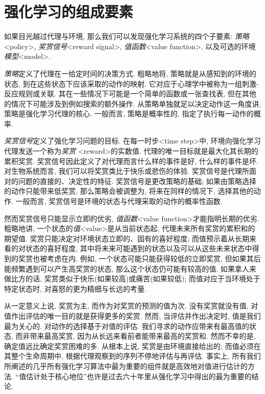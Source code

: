 \section{强化学习的组成要素}\label{sec:1.3}

如果目光越过代理与环境, 那么我们可以发现强化学习系统的四个子要素: \emph{策略}<policy>, \emph{奖赏信号}<reward signal>, \emph{值函数}<value function>, 以及可选的环境\emph{模型}<model>.

\emph{策略}定义了代理在一给定时间的决策方式. 粗略地将, 策略就是从感知到的环境的状态, 到在这些状态下应该采取的动作的映射. 它对应于心理学中被称为一组刺激-反应规则或关联. 其在一些情况下可能是一个简单的函数或一张查找表, 但在其他的情况下可能涉及到例如搜索的额外操作. 从策略单独就足以决定动作这一角度讲, 策略是强化学习代理的核心. 一般而言, 策略是概率性的, 指定了执行每一动作的概率.

\emph{奖赏信号}定义了强化学习问题的目标. 在每一时步<time step>中, 环境向强化学习代理发送一个称为\emph{奖赏} <reward>的实数值. 代理的唯一目标就是最大化其长期的累积奖赏. 奖赏信号因此定义了对代理而言什么样的事件是好, 什么样的事件是坏. 对生物系统而言, 我们可以将奖赏类比于快乐或悲伤的体验. 奖赏信号是代理所面对的问题的直接的、决定性的特征. 奖赏信号是更改策略的基础; 如果由策略选择的动作只能带来低奖赏, 那么策略会被调整为, 将来在同样的情况下, 选择其他的动作. 一般而言, 奖赏信号是环境的状态与代理采取的动作的概率性函数. 

然而奖赏信号只能显示立即的优劣, \emph{值函数}<value function>才能指明长期的优劣. 粗略地讲, 一个状态的\emph{值}<value>是从当前状态起, 代理未来所有奖赏的累积和的期望值. 奖赏只能决定对环境状态立即的、固有的喜好程度; 而值预示着从长期来看的对状态的喜好程度, 其中将未来可能遇到的状态以及可以从这些未来状态中得到的奖赏也被考虑在内. 例如, 一个状态可能只能获得较低的立即奖赏, 但如果其后能频繁遇到可以产生高奖赏的状态, 那么这个状态仍可能有较高的值. 如果拿人来做比方的话, 奖赏类似于快乐(如果较高)或痛苦(如果较低); 而值对应于当环境处于特定状态时, 对喜怒的更为精细与长远的考量.

从一定意义上说, 奖赏为主, 而作为对奖赏的预测的值为次. 没有奖赏就没有值, 对值作出评估的唯一目的就是获得更多的奖赏. 然而, 当评估并作出决定时, 值是我们最为关心的. 对动作的选择基于对值的评估. 我们寻求的动作应带来有最高值的状态, 而非带来最高奖赏, 因为从长远来看前者能带来最高的奖赏和. 然而不幸的是, 确定值远比确定奖赏困难的多. 从根本上说, 奖赏是由环境直接给出的; 而值必须在其整个生命周期中, 根据代理观察到的序列不停地评估与再评估. 事实上, 所有我们所阐述的几乎所有强化学习算法中最为重要的组件就是高效地对值进行估计的方法. ``值估计处于核心地位''也许是过去六十年里从强化学习中得出的最为重要的结论. 

